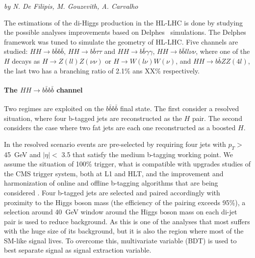 \begin{center}
\textit{by N. De Filipis, M. Gouzevith, A. Carvalho}
\end{center}

The estimations of the di-Higgs production in the HL-LHC is done by studying the possible analyses improvements based on Delphes~\cite{Delphes} simulations. The Delphes framework was tuned to simulate the geometry of HL-LHC. 
Five channels are studied:  $HH \rightarrow b\bar{b}b\bar{b}$, $HH \rightarrow b\bar{b}\tau\tau$ and $HH \rightarrow b\bar{b}\gamma\gamma$, $HH \rightarrow b\bar{b}ll\nu\nu$, where one of the $H$ decays as $H \rightarrow Z(ll)Z(\nu\nu)$ or $H \rightarrow W(l\nu)W(\nu)$, and $HH \rightarrow b\bar{b}ZZ(4l)$, the last two has a branching ratio of 2.1\% ans XX\% respectively.

\paragraph{The $HH \rightarrow b\bar{b}b\bar{b}$ channel}

Two regimes are exploited on the $b\bar{b}b\bar{b}$ final state. The first consider a resolved situation, where four b-tagged jets are reconstructed as the $H$ pair. The second considers the case where two fat jets are each one reconstructed as a boosted $H$.

In the resolved scenario events are pre-selected by requiring four jets with $p_T >$ 45~GeV and $|\eta| <$ 3.5 that satisfy the medium b-tagging working point. We assume the situation of 100\% trigger, what is compatible with upgrades studies of the CMS trigger system, both at L1 and HLT, and the improvement and harmonization of online and offline b-tagging algorithms that are being  considered \cite{PAS}. Four b-tagged jets are selected and paired accordingly with proximity to the Higgs boson mass (the efficiency of the pairing exceeds 95\%), a selection around 40~GeV window around the Higgs boson mass on each di-jet pair is used to reduce background. As this is one of the analyses that most suffers with the huge size of its background, but it is also the region where most of the SM-like signal lives. To overcome this, multivariate variable (BDT) is used to best separate signal as signal extraction variable. 

